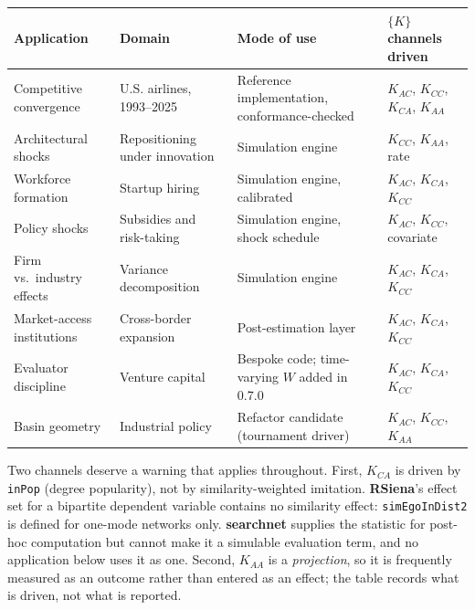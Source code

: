 \documentclass[
]{article}
\newcounter{none} %
\begin{document}
{\def\LTcaptype{none} %
\begin{longtable}[]{@{}
  >{\raggedright\arraybackslash}p{}
  >{\raggedright\arraybackslash}p{}
  >{\raggedright\arraybackslash}p{}
  >{\raggedright\arraybackslash}p{}@{}}
\toprule\noalign{}
\begin{minipage}[b]{\linewidth}\raggedright
Application
\end{minipage} & \begin{minipage}[b]{\linewidth}\raggedright
Domain
\end{minipage} & \begin{minipage}[b]{\linewidth}\raggedright
Mode of use
\end{minipage} & \begin{minipage}[b]{\linewidth}\raggedright
\(\{K\}\) channels driven
\end{minipage} \\
\midrule\noalign{}
\endhead
\bottomrule\noalign{}
\endlastfoot
Competitive convergence & U.S. airlines, 1993--2025 & Reference
implementation, conformance-checked & \(K_{AC}\), \(K_{CC}\),
\(K_{CA}\), \(K_{AA}\) \\
Architectural shocks & Repositioning under innovation & Simulation
engine & \(K_{CC}\), \(K_{AA}\), rate \\
Workforce formation & Startup hiring & Simulation engine, calibrated &
\(K_{AC}\), \(K_{CA}\), \(K_{CC}\) \\
Policy shocks & Subsidies and risk-taking & Simulation engine, shock
schedule & \(K_{AC}\), \(K_{CC}\), covariate \\
Firm vs.~industry effects & Variance decomposition & Simulation engine &
\(K_{AC}\), \(K_{CA}\), \(K_{CC}\) \\
Market-access institutions & Cross-border expansion & Post-estimation
layer & \(K_{AC}\), \(K_{CA}\), \(K_{CC}\) \\
Evaluator discipline & Venture capital & Bespoke code; time-varying
\(W\) added in 0.7.0 & \(K_{AC}\), \(K_{CA}\), \(K_{CC}\) \\
Basin geometry & Industrial policy & Refactor candidate (tournament
driver) & \(K_{AC}\), \(K_{CC}\), \(K_{AA}\) \\
\end{longtable}
}

Two channels deserve a warning that applies throughout. First,
\(K_{CA}\) is driven by \texttt{inPop} (degree popularity), not by
similarity-weighted imitation. \textbf{RSiena}'s effect set for a
bipartite dependent variable contains no similarity effect:
\texttt{simEgoInDist2} is defined for one-mode networks only.
\textbf{searchnet} supplies the statistic for post-hoc computation but
cannot make it a simulable evaluation term, and no application below
uses it as one. Second, \(K_{AA}\) is a \emph{projection}, so it is
frequently measured as an outcome rather than entered as an effect; the
table records what is driven, not what is reported.
\end{document}
